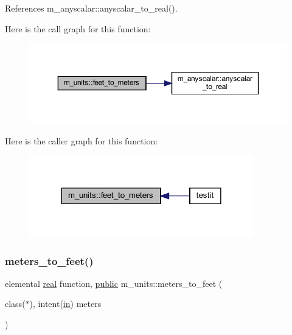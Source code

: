 References m\+\_\+anyscalar\+::anyscalar\+\_\+to\+\_\+real().

Here is the call graph for this function\+:
\nopagebreak
\begin{figure}[H]
\begin{center}
\leavevmode
\includegraphics[width=350pt]{namespacem__units_a6b2e3302766d3ee6edbb2d6d3c284e96_cgraph}
\end{center}
\end{figure}
Here is the caller graph for this function\+:
\nopagebreak
\begin{figure}[H]
\begin{center}
\leavevmode
\includegraphics[width=276pt]{namespacem__units_a6b2e3302766d3ee6edbb2d6d3c284e96_icgraph}
\end{center}
\end{figure}
\mbox{\label{namespacem__units_a0ac5ab49814761420953eb6b859c80fd}} 
\subsubsection{\texorpdfstring{meters\+\_\+to\+\_\+feet()}{meters\_to\_feet()}}
{\footnotesize\ttfamily elemental \hyperlink{read__watch_83_8txt_abdb62bde002f38ef75f810d3a905a823}{real} function, \hyperlink{M__stopwatch_83_8txt_a2f74811300c361e53b430611a7d1769f}{public} m\+\_\+units\+::meters\+\_\+to\+\_\+feet (\begin{DoxyParamCaption}\item[{class($\ast$), intent(\hyperlink{M__journal_83_8txt_afce72651d1eed785a2132bee863b2f38}{in})}]{meters }\end{DoxyParamCaption})}



